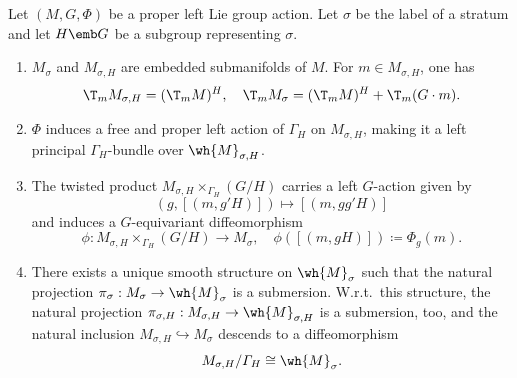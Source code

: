 \begin{prop}[{{\cite[Prop.~6.6.1]{RS1}}}]\label{prop strata}
    Let $(M,G,\Phi)$ be a proper left Lie group action. Let $\sigma$ be the label of a stratum and let $H\emb G$ be a subgroup representing $\sigma$.
    \begin{enumerate}
        \item $M_\sigma$ and $M_{\sigma,H}$ are embedded submanifolds of $M$. For $m\in M_{\sigma,H}$, one has 
        \[\T_m M_{\sigma,H}=(\T_m M)^H,\quad \T_m M_\sigma=(\T_m M)^H+\T_m (G\cdot m).\]
        \item $\Phi$ induces a free and proper left action of $\varGamma_H$ on $M_{\sigma,H}$, making it a left principal $\varGamma_H$-bundle over $\wh{M}_{\sigma,H}$.
        \item The twisted product $M_{\sigma,H}\times_{\varGamma_H}(G\slash H)$ carries a left $G$-action given by 
        \[\left(g,\left[(m,g'H)\right]\right)\mapsto \left[(m,gg'H)\right]\]
        and induces a $G$-equivariant diffeomorphism 
        \[\phi:M_{\sigma,H}\times_{\varGamma_H}(G\slash H)\to M_\sigma,\quad \phi\left(\left[(m,gH)\right]\right)\coloneqq \Phi_g(m).\]
        \item There exists a unique smooth structure on $\wh{M}_\sigma$ such that the natural projection $\pi_\sigma:M_\sigma\to \wh{M}_\sigma$ is a submersion. W.r.t.\ this structure, the natural projection $\pi_{\sigma,H}:M_{\sigma,H}\to \wh{M}_{\sigma,H}$ is a submersion, too, and the natural inclusion $M_{\sigma,H}\hookrightarrow M_\sigma$ descends to a diffeomorphism 
        \[M_{\sigma,H}\slash \varGamma_H\cong \wh{M}_\sigma.\]
    \end{enumerate}
\end{prop}
